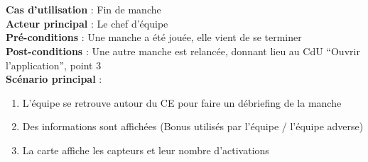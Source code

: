 \paragraph{}
~\\
\textbf{Cas d’utilisation} :  Fin de manche\\
\textbf{Acteur principal} : Le chef d’équipe\\
\textbf{Pré-conditions} : Une manche a été jouée, elle vient de se terminer\\
\textbf{Post-conditions} :  Une autre manche est relancée, donnant lieu au CdU “Ouvrir l’application”, point 3\\
\textbf{Scénario principal} :
\begin{enumerate}
 \item L’équipe se retrouve autour du CE pour faire un débriefing de la manche
 \item Des informations sont affichées (Bonus utilisés par l’équipe / l’équipe adverse)
 \item La carte affiche les capteurs et leur nombre d’activations
\end{enumerate}

